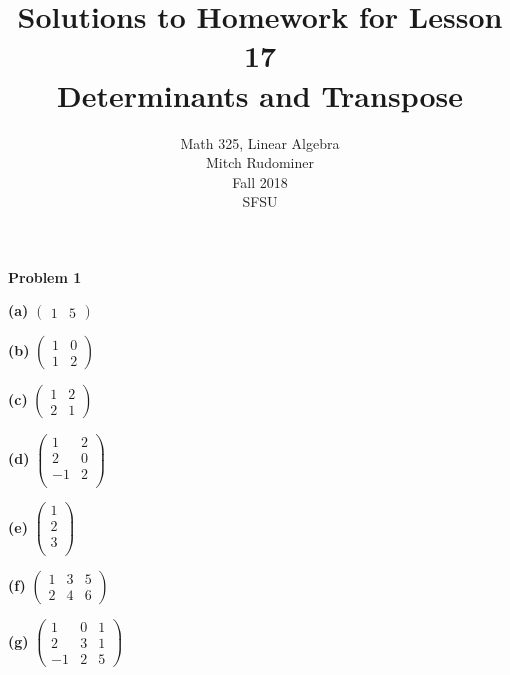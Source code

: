 \documentclass[oneside,12pt]{amsart}
\begin{document}
\title{Solutions to Homework for Lesson 17 \\ Determinants and Transpose}
\author{Math 325, Linear Algebra \\ Mitch Rudominer \\ Fall 2018 \\ SFSU }
\date{}

\maketitle


\textbf{Problem 1}

\bigskip

\textbf{(a)}
$
\begin{pmatrix}
1 & 5
\end{pmatrix}
$

\bigskip

\textbf{(b)}
$
\begin{pmatrix}
1 & 0 \\
1 & 2
\end{pmatrix}
$

\bigskip

\textbf{(c)}
$
\begin{pmatrix}
1 & 2 \\
2 & 1
\end{pmatrix}
$

\bigskip

\textbf{(d)}
$
\begin{pmatrix}
1 & 2 \\
2 & 0 \\
-1 & 2 \\
\end{pmatrix}
$

\bigskip

\textbf{(e)}
$
\begin{pmatrix}
1 \\
2 \\
3 \\
\end{pmatrix}
$

\bigskip

\textbf{(f)}
$
\begin{pmatrix}
1 & 3 & 5 \\
2 & 4 & 6
\end{pmatrix}
$

\bigskip

\textbf{(g)}
$
\begin{pmatrix}
1 & 0 & 1 \\
2 & 3 & 1 \\
-1 & 2 & 5
\end{pmatrix}
$
\end{document}

